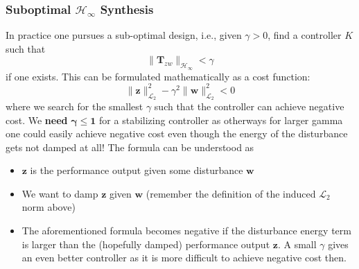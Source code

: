 \subsubsection[Suboptimal H-infinity Synthesis]{Suboptimal $\mathcal{H}_\infty$ Synthesis}
\newpar{}
In practice one pursues a sub-optimal design, i.e., given $\gamma>0$, find a controller $K$ such that
\begin{equation*}
    \|\mathbf{T}_{zw}\|_{\mathcal{H}_\infty}<\gamma
\end{equation*}
if one exists. This can be formulated mathematically as a cost function:
\begin{equation*}
    \|\mathbf{z}\|_{\mathcal{L}_2}^2-\gamma^2\|\mathbf{w}\|_{\mathcal{L}_2}^2 < 0
\end{equation*}
where we search for the smallest $\gamma$ such that the controller can achieve negative cost. We \textbf{need} $\boldsymbol{\gamma}\mathbf{\le1}$ for a stabilizing controller as otherways for larger gamma one could easily achieve negative cost even though the energy of the disturbance gets not damped at all! The formula can be understood as
\begin{itemize}
    \item $\mathbf{z}$ is the performance output given some disturbance $\mathbf{w}$
    \item We want to damp $\mathbf{z}$ given $\mathbf{w}$ (remember the definition of the induced $\mathcal{L}_2$ norm above)
    \item The aforementioned formula becomes negative if the disturbance energy term is larger than the (hopefully damped) performance output $\mathbf{z}$. A small $\gamma$ gives an even better controller as it is more difficult to achieve negative cost then.
\end{itemize}

\newpar{}

